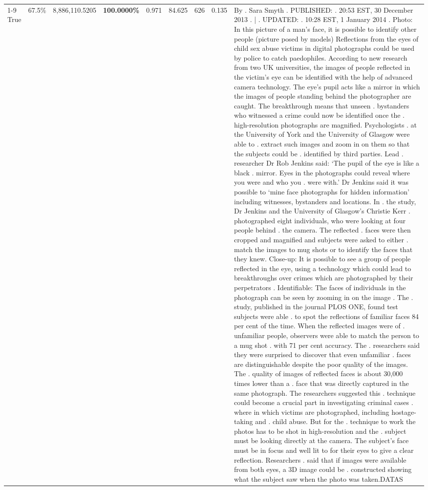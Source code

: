 \begin{table}[H]
\begin{tabular}{lllrlllll}
\cline{1-9} \cline{2-9}
True & 67.5\% & 8,886,110.5205 & \bfseries \color{red} 100.0000\% & 0.971 & 84.625 & 626 & 0.135 & By . Sara Smyth . PUBLISHED: . 20:53 EST, 30 December 2013 . | . UPDATED: . 10:28 EST, 1 January 2014 . Photo: In this picture of a man's face, it is possible to identify other people (picture posed by models) Reflections from the eyes of child sex abuse victims in digital photographs could be used by police to catch paedophiles. According to new research from two UK universities, the images of people reflected in the victim's eye can be identified with the help of advanced camera technology. The eye's pupil acts like a mirror in which the images of people standing behind the photographer are caught. The breakthrough means that unseen . bystanders who witnessed a crime could now be identified once the . high-resolution photographs are magnified. Psychologists . at the University of York and the University of Glasgow were able to . extract such images and zoom in on them so that the subjects could be . identified by third parties. Lead . researcher Dr Rob Jenkins said: ‘The pupil of the eye is like a black . mirror. Eyes in the photographs could reveal where you were and who you . were with.' Dr Jenkins said it was possible to ‘mine face photographs for hidden information' including witnesses, bystanders and locations. In . the study, Dr Jenkins and the University of Glasgow's Christie Kerr . photographed eight individuals, who were looking at four people behind . the camera. The reflected . faces were then cropped and magnified and subjects were asked to either . match the images to mug shots or to identify the faces that they knew. Close-up: It is possible to see a group of people reflected in the eye, using a technology which could lead to breakthroughs over crimes which are photographed by their perpetrators . Identifiable: The faces of individuals in the photograph can be seen by zooming in on the image . The . study, published in the journal PLOS ONE, found test subjects were able . to spot the reflections of familiar faces 84 per cent of the time. When the reflected images were of . unfamiliar people, observers were able to match the person to a mug shot . with 71 per cent accuracy. The . researchers said they were surprised to discover that even unfamiliar . faces are distinguishable despite the poor quality of the images. The . quality of images of reflected faces is about 30,000 times lower than a . face that was directly captured in the same photograph. The researchers suggested this . technique could become a crucial part in investigating criminal cases . where in which victims are photographed, including hostage-taking and . child abuse. But for the . technique to work the photos has to be shot in high-resolution and the . subject must be looking directly at the camera. The subject's face must be in focus and well lit to for their eyes to give a clear reflection. Researchers . said that if images were available from both eyes, a 3D image could be . constructed showing what the subject saw when the photo was taken.DATAS \\

\end{tabular}
\end{table}
